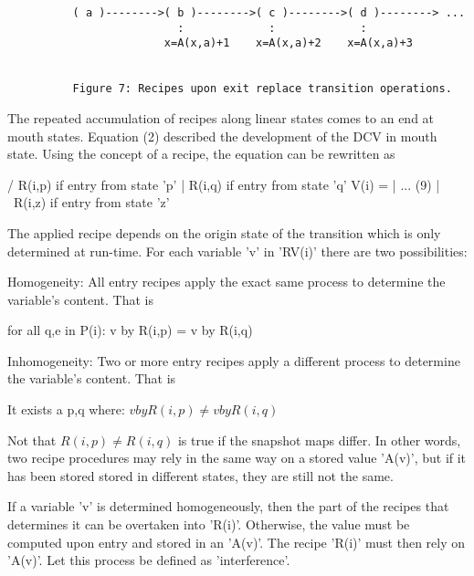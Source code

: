 \documentclass[12pt]{article}
\begin{document}
\begin{verbatim}
          ( a )-------->( b )-------->( c )-------->( d )--------> ...
                          :             :             :
                        x=A(x,a)+1    x=A(x,a)+2    x=A(x,a)+3


          Figure 7: Recipes upon exit replace transition operations.
\end{verbatim}

The repeated accumulation of recipes along linear states comes to an end at
mouth states.  Equation (2) described the development of the DCV in mouth
state. Using the concept of a recipe, the equation can be rewritten as

                     /  R(i,p)  if entry from state 'p'
                     |  R(i,q)  if entry from state 'q'
            V(i) = |   ...                                                (9)
                     |  
                     \  R(i,z)  if entry from state 'z'

The applied recipe depends on the origin state of the transition which is only
determined at run-time.  For each variable 'v' in 'RV(i)' there are two
possibilities:

   Homogeneity:   All entry recipes apply the exact same process to
                  determine the variable's content. That is

                  for all q,e in P(i): v by R(i,p) = v by R(i,q) 

   Inhomogeneity: Two or more entry recipes apply a different process
                  to determine the variable's content. That is

                  It exists a p,q where: \(v by R(i,p) \neq v by R(i,q)\)

Not that \(R(i,p) \neq R(i,q)\) is true if the snapshot maps differ. In other
words, two recipe procedures may rely in the same way on a stored value 'A(v)',
but if it has been stored stored in different states, they are still not
the same.

If a variable 'v' is determined homogeneously, then the part of the recipes
that determines it can be overtaken into 'R(i)'. Otherwise, the value must be
computed upon entry and stored in an 'A(v)'. The recipe 'R(i)' must then rely
on 'A(v)'. Let this process be defined as 'interference'.
\end{document}
